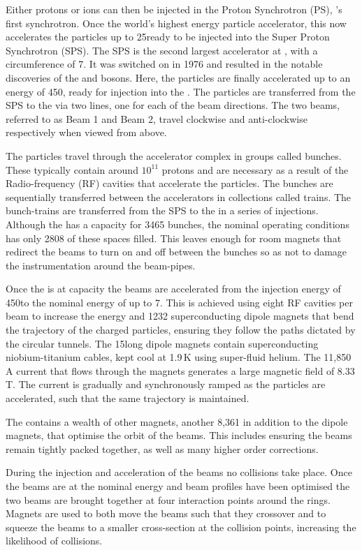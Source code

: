Either protons or ions can then be injected in the Proton Synchrotron (PS), \cern's first synchrotron. Once the world's highest energy particle accelerator, this now accelerates the particles up to 25\gev ready to be injected into the Super Proton Synchrotron (SPS).
The SPS is the second largest accelerator at \cern, with a circumference of 7\km. It was switched on in 1976 and resulted in the notable discoveries of the \W and \Z bosons. Here, the particles are finally accelerated up to an energy of 450\gev, ready for injection into the \lhc. The particles are transferred from the SPS to the \lhc via two lines, one for each of the \lhc beam directions. The two beams, referred to as Beam 1 and Beam 2, travel clockwise and anti-clockwise respectively when viewed from above.

The particles travel through the accelerator complex in groups called bunches. These typically contain around $10^{11}$ protons and are necessary as a result of the Radio-frequency (RF) cavities that accelerate the particles. The bunches are sequentially transferred between the accelerators in collections called trains. The bunch-trains are transferred from the SPS to the \lhc in a series of injections. Although the \lhc has a capacity for 3465 bunches, the nominal operating conditions has only 2808 of these spaces filled. This leaves enough for room magnets that redirect the beams to turn on and off between the bunches so as not to damage the instrumentation around the beam-pipes.  

Once the \lhc is at capacity the beams are accelerated from the injection energy of 450\gev to the nominal energy of up to 7\tev. This is achieved using eight RF cavities per beam to increase the energy and 1232 superconducting dipole magnets that bend the trajectory of the charged particles, ensuring they follow the paths dictated by the circular tunnels. The 15\m long dipole magnets contain superconducting niobium-titanium cables, kept cool at 1.9\,K using super-fluid helium. The 11,850\,A current that flows through the magnets generates a large magnetic field of 8.33\,T. The current is gradually and synchronously ramped as the particles are accelerated, such that the same trajectory is maintained. 

The \lhc contains a wealth of other magnets, another 8,361 in addition to the dipole magnets, that optimise the orbit of the beams. This includes ensuring the beams remain tightly packed together, as well as many higher order corrections.   

During the injection and acceleration of the beams no collisions take place. Once the beams are at the nominal energy and beam profiles have been optimised the two beams are brought together at four interaction points around the rings. Magnets are used to both move the beams such that they crossover and to squeeze the beams to a smaller cross-section at the collision points, increasing the likelihood of collisions.    

